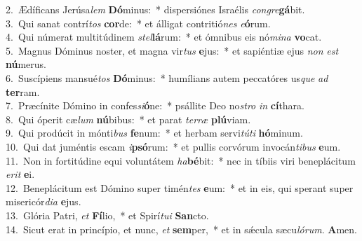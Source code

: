 {2.~}Ædíficans Jerúsa\textit{lem} \textbf{Dó}minus:~* dispersiónes Israélis \textit{con}\textit{gre}\textbf{gá}bit.\\
{3.~}Qui sanat contrí\textit{tos} \textbf{cor}de:~* et álligat contritió\textit{nes} \textit{e}\textbf{ó}rum.\\
{4.~}Qui númerat multitúdinem \textit{stel}\textbf{lá}rum:~* et ómnibus eis nó\textit{mi}\textit{na} \textbf{vo}cat.\\
{5.~}Magnus Dóminus noster, et magna vir\textit{tus} \textbf{e}jus:~* et sapiéntiæ ejus \textit{non} \textit{est} \textbf{nú}merus.\\
{6.~}Suscípiens mansué\textit{tos} \textbf{Dó}minus:~* humílians autem peccatóres us\textit{que} \textit{ad} \textbf{ter}ram.\\
{7.~}Præcínite Dómino in confes\textit{si}\textbf{ó}ne:~* psállite Deo no\textit{stro} \textit{in} \textbf{cí}thara.\\
{8.~}Qui óperit cæ\textit{lum} \textbf{nú}bibus:~* et parat \textit{ter}\textit{ræ} \textbf{plú}viam.\\
{9.~}Qui prodúcit in mónti\textit{bus} \textbf{fe}num:~* et herbam servi\textit{tú}\textit{ti} \textbf{hó}minum.\\
{10.~}Qui dat juméntis escam \textit{i}\textbf{psó}rum:~* et pullis corvórum invocán\textit{ti}\textit{bus} \textbf{e}um.\\
{11.~}Non in fortitúdine equi voluntátem \textit{ha}\textbf{bé}bit:~* nec in tíbiis viri beneplácitum \textit{e}\textit{rit} \textbf{e}i.\\
{12.~}Beneplácitum est Dómino super timén\textit{tes} \textbf{e}um:~* et in eis, qui sperant super misericór\textit{di}\textit{a} \textbf{e}jus.\\
{13.~}Glória Patri, \textit{et} \textbf{Fí}lio,~* et Spirí\textit{tu}\textit{i} \textbf{San}cto.\\
{14.~}Sicut erat in princípio, et nunc, \textit{et} \textbf{sem}per,~* et in sǽcula sæcu\textit{ló}\textit{rum}. \textbf{A}men.\\
